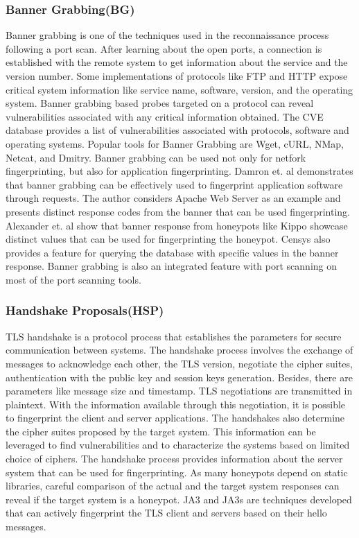 \subsubsection{Banner Grabbing(BG)}
Banner grabbing is one of the techniques used in the reconnaissance process following a port scan. After learning about the open ports, a connection is established with the remote system to get information about the service and the version number. Some implementations of protocols like FTP and HTTP expose critical system information like service name, software, version, and the operating system. Banner grabbing based probes targeted on a protocol can reveal vulnerabilities associated with any critical information obtained. The CVE database \cite{CVE} provides a list of vulnerabilities associated with protocols, software and operating systems. Popular tools for Banner Grabbing are Wget\cite{wget}, cURL\cite{curl}, NMap\cite{NMap}, Netcat\cite{netcat}, and Dmitry\cite{dmitry}. Banner grabbing can be used not only for netfork fingerprinting, but also for application fingerprinting. Damron et. al \cite{bannergrab} demonstrates that banner grabbing can be effectively used to fingerprint application software through requests. The author considers Apache Web Server as an example and presents distinct response codes from the banner that can be used fingerprinting. Alexander et. al \cite{Vetterl2018} show that banner response from honeypots like Kippo showcase distinct values that can be used for fingerprinting the honeypot. Censys also provides a feature for querying the database with specific values in the banner response. Banner grabbing is also an integrated feature with port scanning on most of the port scanning tools. 

\subsubsection{Handshake Proposals(HSP)}
TLS handshake is a protocol process that establishes the parameters for secure communication between systems. The handshake process involves the exchange of messages to acknowledge each other, the TLS version,  negotiate the cipher suites, authentication with the public key and session keys generation. Besides, there are parameters like message size and timestamp. TLS negotiations are transmitted in plaintext. With the information available through this negotiation, it is possible to fingerprint the client and server applications.  The handshakes also determine the cipher suites proposed by the target system. This information can be leveraged to find vulnerabilities and to characterize the systems based on limited choice of ciphers. The handshake process provides information about the server system that can be used for fingerprinting. As many honeypots depend on static libraries, careful comparison of the actual and the target system responses can reveal if the target system is a honeypot. 
JA3 and JA3s\cite{JA3} are techniques developed that can actively fingerprint the TLS client and servers based on their hello messages. 



